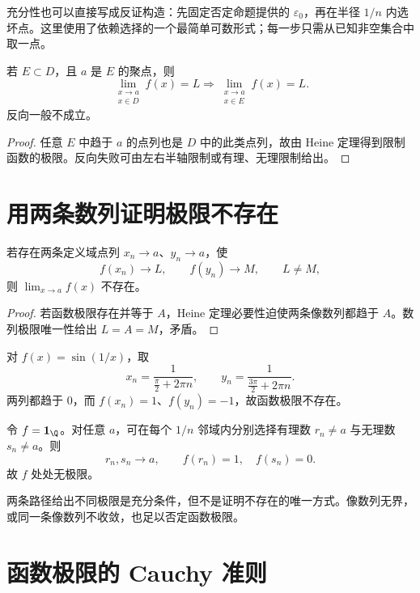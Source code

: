 充分性也可以直接写成反证构造：先固定否定命题提供的 \(\varepsilon_0\)，再在半径 \(1/n\) 内选坏点。这里使用了依赖选择的一个最简单可数形式；每一步只需从已知非空集合中取一点。

\begin{proposition}[定义域限制]
若 \(E\subset D\)，且 \(a\) 是 \(E\) 的聚点，则
\[
 \lim_{\substack{x\to a\\x\in D}}f(x)=L
 \Longrightarrow
 \lim_{\substack{x\to a\\x\in E}}f(x)=L.
\]
反向一般不成立。
\end{proposition}

\begin{proof}
任意 \(E\) 中趋于 \(a\) 的点列也是 \(D\) 中的此类点列，故由 Heine 定理得到限制函数的极限。反向失败可由左右半轴限制或有理、无理限制给出。
\end{proof}

\section{用两条数列证明极限不存在}

\begin{proposition}[双路径判别]
若存在两条定义域点列 \(x_n\to a\)、\(y_n\to a\)，使
\[
 f(x_n)\to L,\qquad f(y_n)\to M,\qquad L\ne M,
\]
则 \(\lim_{x\to a}f(x)\) 不存在。
\end{proposition}

\begin{proof}
若函数极限存在并等于 \(A\)，Heine 定理必要性迫使两条像数列都趋于 \(A\)。数列极限唯一性给出 \(L=A=M\)，矛盾。
\end{proof}

\begin{example}
对 \(f(x)=\sin(1/x)\)，取
\[
 x_n=\frac1{\frac\pi2+2\pi n},\qquad
 y_n=\frac1{\frac{3\pi}2+2\pi n}.
\]
两列都趋于 \(0\)，而 \(f(x_n)=1\)、\(f(y_n)=-1\)，故函数极限不存在。
\end{example}

\begin{example}[有理与无理路径]
令 \(f=\mathbf1_{\Q}\)。对任意 \(a\)，可在每个 \(1/n\) 邻域内分别选择有理数 \(r_n\ne a\) 与无理数 \(s_n\ne a\)。则
\[
 r_n,s_n\to a,\qquad f(r_n)=1,\quad f(s_n)=0.
\]
故 \(f\) 处处无极限。
\end{example}

两条路径给出不同极限是充分条件，但不是证明不存在的唯一方式。像数列无界，或同一条像数列不收敛，也足以否定函数极限。

\section{函数极限的 Cauchy 准则}

